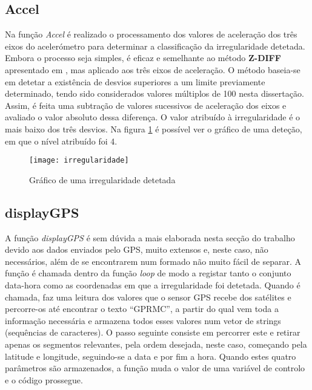 \subsection{Accel}
\label{sub:accel}

Na função \emph{Accel} é realizado o processamento dos valores de aceleração dos três eixos do acelerómetro para determinar a classificação da irregularidade detetada.
Embora o processo seja simples, é eficaz e semelhante ao método \textbf{Z-DIFF} apresentado em \cite{Mednis2011}, mas aplicado aos três eixos de aceleração.
O método baseia-se em detetar a existência de desvios superiores a um limite previamente determinado, tendo sido considerados valores múltiplos de 100 nesta dissertação.
Assim, é feita uma subtração de valores sucessivos de aceleração dos eixos e avaliado o valor absoluto dessa diferença.
O valor atribuído à irregularidade é o mais baixo dos três desvios.
Na figura \ref{fig:grafico_de_uma_irregularidade_detetada} é possível ver o gráfico de uma deteção, em que o nível atribuído foi 4.

\begin{figure}[hbtp]
	\centering
	\texttt{[image: irregularidade]}
	\caption{Gráfico de uma irregularidade detetada}
	\label{fig:grafico_de_uma_irregularidade_detetada}
\end{figure}

\subsection{displayGPS}
\label{sub:displayGPS}

A função \emph{displayGPS} é sem dúvida a mais elaborada nesta secção do trabalho devido aos dados enviados pelo GPS, muito extensos e, neste caso, não necessários, além de se encontrarem num formado não muito fácil de separar.
A função é chamada dentro da função \emph{loop} de modo a registar tanto o conjunto data-hora como as coordenadas em que a irregularidade foi detetada.
Quando é chamada, faz uma leitura dos valores que o sensor GPS recebe dos satélites e percorre-os até encontrar o texto ``GPRMC'', a partir do qual vem toda a informação necessária e armazena todos esses valores num vetor de strings (sequências de caracteres).
O passo seguinte consiste em percorrer este  e retirar apenas os segmentos relevantes, pela ordem desejada, neste caso, começando pela latitude e longitude, seguindo-se a data e por fim a hora.
Quando estes quatro parâmetros são armazenados, a função muda o valor de uma variável de controlo e o código prossegue.

